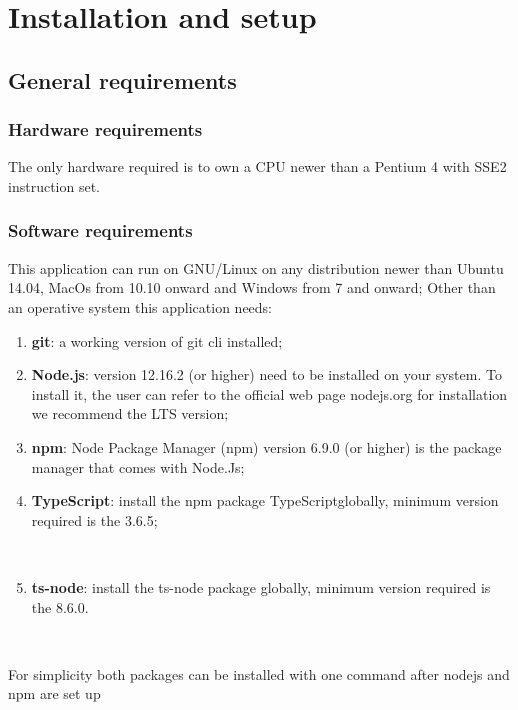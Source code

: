 \section{Installation and setup}
\subsection{General requirements}
\subsubsection{Hardware requirements}
The only hardware required is to own a CPU newer than a Pentium 4 with SSE2 instruction set. 
\subsubsection{Software requirements }
This application can run on GNU/Linux on any distribution newer than Ubuntu 14.04, MacOs from 10.10 onward and Windows from 7 and onward; Other than an operative system this application needs: 
\begin{enumerate}
	\item \textbf{git}: a working version of git cli installed;
	\item \textbf{Node.js}: version 12.16.2 (or higher) need to be installed on your system. To install it, the user can refer to the official web page nodejs.org for installation we recommend the LTS version;
	\item \textbf{npm}: Node Package Manager (npm) version 6.9.0 (or higher) is the package manager that comes with Node.Js; 
	\item \textbf{TypeScript}: install the npm package TypeScript\glo globally, minimum version required is the 3.6.5; \newline\newline \centerline{}\\
	\item \textbf{ts-node}: install the ts-node package globally, minimum version required is the 8.6.0. \newline\newline \centerline{}\\
\end{enumerate}
For simplicity both packages can be installed with one command after nodejs and npm are set up\\\\
\centerline{}\\
